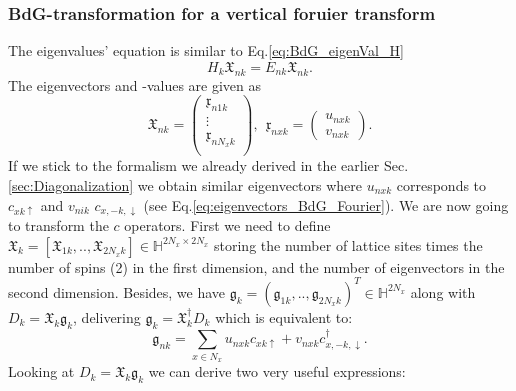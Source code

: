 \documentclass[../main.tex]{subfile}
\begin{document}
\subsubsection{BdG-transformation for a vertical foruier transform}
The eigenvalues' equation is similar to Eq.\ref{eq:BdG_eigenVal_H}
\begin{equation}\label{eq:BdG_eigenVal_H_k}
    H_k \mathfrak{X}_{nk} = E_{nk} \mathfrak{X}_{nk}.
\end{equation}
The eigenvectors and -values are given as
\begin{equation*}
    \mathfrak{X}_{nk} = \begin{pmatrix}
        \mathfrak{x}_{n1k}\\
        \vdots\\
        \mathfrak{x}_{nN_xk}\\
    \end{pmatrix},~~ \mathfrak{x}_{nxk} = \begin{pmatrix}
        u_{nxk}\\
        v_{nxk}
    \end{pmatrix}.
\end{equation*}
If we stick to the formalism we already derived in the earlier Sec.\ref{sec:Diagonalization} we obtain similar 
eigenvectors where $u_{nxk}$ corresponds to $c_{xk\uparrow}$ and $v_{nik}$  $c_{x,-k,\downarrow}$ (see Eq.\ref{eq:eigenvectors_BdG_Fourier}). We are now going to transform the $c$ operators. First we need
to define $\mathfrak{X}_k = [\mathfrak{X}_{1k}, ..,\mathfrak{X}_{2N_xk}]\in\mathbb{H}^{2N_x\times 2N_x}$ storing the number of 
lattice sites times the number of spins (2) in the first dimension, and 
the number of eigenvectors in the second dimension. Besides, we have $\mathfrak{g}_k = (\mathfrak{g}_{1k}, .., \mathfrak{g}_{2N_xk})^T\in\mathbb{H}^{2N_x}$ along with $D_{k} = \mathfrak{X}_k\mathfrak{g}_k$,
delivering $\mathfrak{g}_k = \mathfrak{X}^{\dagger}_k D_{k}$ which is equivalent to:
\begin{equation}\label{eq:eigenvectors_BdG_Fourier}
    \mathfrak{g}_{nk} = \sum_{x\in{N_x}} u_{nxk}c_{xk\uparrow} + v_{nxk}c^{\dagger}_{x,-k,\downarrow}.
\end{equation}
Looking at $D_{k} = \mathfrak{X}_k\mathfrak{g}_k$ we can derive two very useful expressions:
\end{document}
